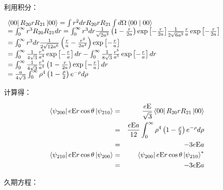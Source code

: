 利用积分：

$\begin{array}{l}
 \left\langle {00} \right|R_{20} rR_{21} \left| {00} \right\rangle  = \int {r^2 dr} R_{20} rR_{21} \int {d\Omega \left\langle {{00}}
 \mathrel{\left | {\vphantom {{00} {00}}}
 \right. \kern-\nulldelimiterspace}
 {{00}} \right\rangle }  \\
  = \int_0^\infty  {r^3 R_{20} R_{21} dr}  = \int_0^\infty  {r^3 dr\frac{1}{{\sqrt {2a^3 } }}\left( {1 - \frac{r}{{2a}}} \right)\exp \left[ { - {\textstyle{r \over {2a}}}} \right]} \frac{1}{{2\sqrt {6a^3 } }}\frac{r}{a}\exp \left[ { - {\textstyle{r \over {2a}}}} \right] \\
  = \int_0^\infty  {r^3 dr\frac{1}{{2\sqrt {12a^6 } }}} \left( {\frac{r}{a} - \frac{{r^2 }}{{2a^2 }}} \right)\exp \left[ { - {\textstyle{r \over a}}} \right] \\
  = \int_0^\infty  {\frac{1}{{4\sqrt 3 }}\frac{{r^4 }}{{a^4 }}} \exp \left[ { - {\textstyle{r \over a}}} \right]dr - \int_0^\infty  {\frac{1}{{8\sqrt 3 }}\frac{{r^5 }}{{a^5 }}} \exp \left[ { - {\textstyle{r \over a}}} \right]dr \\
  = \int_0^\infty  {\frac{1}{{4\sqrt 3 }}} \frac{{r^4 }}{{a^4 }}\left( {1 - \frac{r}{{2a}}} \right)\exp \left[ { - {\textstyle{r \over a}}} \right]dr \\
  = \frac{a}{{4\sqrt 3 }}\int_0^\infty  {\rho ^4 \left( {1 - {\textstyle{\rho  \over 2}}} \right)e^{ - \rho } d\rho }  \\
 \end{array}$

计算得：


\begin{eqnarray*}
\left\langle {\psi _{200} } \right|e{\rm E}r\cos \theta \left| {\psi _{210} } \right\rangle & = & \frac{{e{\rm E}}}{{\sqrt 3 }}\left\langle {00} \right|R_{20} rR_{21} \left| {00} \right\rangle \\
{} & = & \frac{{e{\rm E}a}}{{12}}\int_0^\infty  {\rho ^4 \left( {1 - {\textstyle{\rho  \over 2}}} \right)e^{ - \rho } d\rho } \\
{} & = &  - 3e{\rm E}a\\
\left\langle {\psi _{210} } \right|e{\rm E}r\cos \theta \left| {\psi _{200} } \right\rangle & = & \left\langle {\psi _{200} } \right|e{\rm E}r\cos \theta \left| {\psi _{210} } \right\rangle ^* \\
{} &  = &  - 3e{\rm E}a
 \end{eqnarray*}


久期方程：


